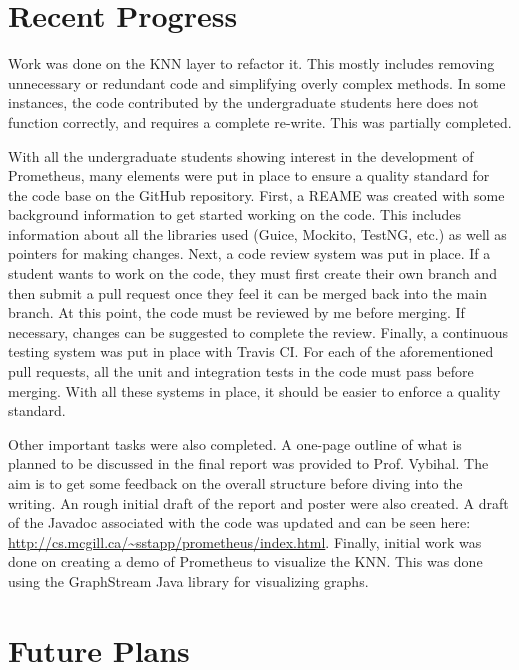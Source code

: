 \documentclass[]{article}
\begin{document}
	\section{Recent Progress} \label{sec:progress}
	
	Work was done on the KNN layer to refactor it. This mostly includes removing unnecessary or redundant code and simplifying overly complex methods. In some instances, the code contributed by the undergraduate students here does not function correctly, and requires a complete re-write. This was partially completed.
	
	With all the undergraduate students showing interest in the development of Prometheus, many elements were put in place to ensure a quality standard for the code base on the GitHub repository. First, a REAME was created with some background information to get started working on the code. This includes information about all the libraries used (Guice, Mockito, TestNG, etc.) as well as pointers for making changes. Next, a code review system was put in place. If a student wants to work on the code, they must first create their own branch and then submit a pull request once they feel it can be merged back into the main branch. At this point, the code must be reviewed by me before merging. If necessary, changes can be suggested to complete the review. Finally, a continuous testing system was put in place with Travis CI. For each of the aforementioned pull requests, all the unit and integration tests in the code must pass before merging. With all these systems in place, it should be easier to enforce a quality standard.
	
	Other important tasks were also completed. A one-page outline of what is planned to be discussed in the final report was provided to Prof. Vybihal. The aim is to get some feedback on the overall structure before diving into the writing. An rough initial draft of the report and poster were also created. A draft of the Javadoc associated with the code was updated and can be seen here: \url{http://cs.mcgill.ca/~sstapp/prometheus/index.html}. Finally, initial work was done on creating a demo of Prometheus to visualize the KNN. This was done using the GraphStream Java library for visualizing graphs.
	
	
	\section{Future Plans} \label{sec:plans}
		
\end{document}
